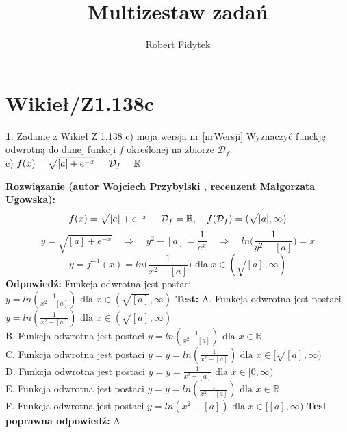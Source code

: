 \documentclass[12pt, a4paper]{article}
\title{Multizestaw zadań}
\author{Robert Fidytek}
\date{}
\theoremstyle{definition} %
\newtheorem{zad}{}
\newcommand{\kategoria}[1]{\section{#1}} %
\newcommand{\zadStart}[1]{\begin{zad}#1\newline} %
\newcommand{\zadStop}{\end{zad}}   %
\newcommand{\rozwStart}[2]{\noindent \textbf{Rozwiązanie (autor #1 , recenzent #2): }\newline} %
\newcommand{\rozwStop}{\newline}                                            %
\newcommand{\odpStart}{\noindent \textbf{Odpowiedź:}\newline}    %
\newcommand{\odpStop}{\newline}                                             %
\newcommand{\testStart}{\noindent \textbf{Test:}\newline} %
\newcommand{\testStop}{\newline} %
\newcommand{\kluczStart}{\noindent \textbf{Test poprawna odpowiedź:}\newline} %
\newcommand{\kluczStop}{\newline} %
\begin{document}
\maketitle


\kategoria{Wikieł/Z1.138c}
\zadStart{Zadanie z Wikieł Z 1.138 c) moja wersja nr [nrWersji]}
Wyznaczyć funckję odwrotną do danej funkcji $f$ określonej na zbiorze $\mathcal{D}_{f}$.\\
c) $f(x)=\sqrt{[a]+e^{-x}}\hspace{5mm}\mathcal{D}_{f}=\mathbb{R}$
\zadStop
\rozwStart{Wojciech Przybylski}{Małgorzata Ugowska}
$$f(x)=\sqrt{[a]+e^{-x}}\hspace{5mm} \mathcal{D}_{f}=\mathbb{R}, \quad f(\mathcal{D}_{f})=(\sqrt{[a]},\infty)$$
$$y=\sqrt{[a]+e^{-x}} \quad \Rightarrow \quad y^{2}-[a]=\frac{1}{e^{x}} \quad \Rightarrow \quad ln\Big(\frac{1}{y^{2}-[a]}\Big)=x$$
$$y=f^{-1}(x)=ln\Big(\frac{1}{x^{2}-[a]}\Big) \mbox{ dla } x\in(\sqrt{[a]},\infty) $$
\rozwStop
\odpStart
Funkcja odwrotna jest postaci $y=ln(\frac{1}{x^{2}-[a]}) \mbox{ dla }x\in(\sqrt{[a]},\infty)$
\odpStop
\testStart
A. Funkcja odwrotna jest postaci $y=ln(\frac{1}{x^{2}-[a]}) \mbox{ dla }x\in(\sqrt{[a]},\infty)$\\
B. Funkcja odwrotna jest postaci $y=ln(\frac{1}{x^{2}-[a]}) \mbox{ dla }x\in\mathbb{R}$\\
C. Funkcja odwrotna jest postaci $y=y=ln(\frac{1}{x^{2}-[a]}) \mbox{ dla }x\in[\sqrt{[a]},\infty)$\\
D. Funkcja odwrotna jest postaci $y=y=\frac{1}{x^{3}-[a]} \mbox{ dla }x\in[0,\infty)$\\
E. Funkcja odwrotna jest postaci $y=y=ln(\frac{1}{x^{3}-[a]}) \mbox{ dla }x\in \mathbb{R}$\\
F. Funkcja odwrotna jest postaci $y=ln(x^{2}-[a])\mbox{ dla }x\in[[a],\infty)$
\testStop
\kluczStart
A
\kluczStop
\end{document}
